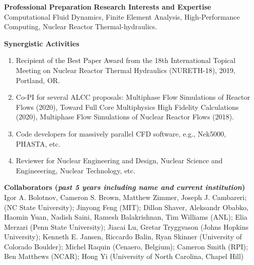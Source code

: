 \documentclass[11pt,letterpaper,english]{article}
\begin{document}
\begin{flushleft} {\bf Professional Preparation}
\vspace{-6pt}
{\bf Research Interests and Expertise}
{\parindent 16pt
Computational Fluid Dynamics, Finite Element Analysis, High-Performance Computing, Nuclear Reactor Thermal-hydraulics.
}

\vspace{.04in}
{\bf Synergistic Activities}
\vspace{-6pt}
\begin{enumerate} \itemsep1pt \parskip0pt 
\item Recipient of the Best Paper Award from the 18th International Topical Meeting on Nuclear Reactor Thermal Hydraulics (NURETH-18), 2019, Portland, OR.
\item Co-PI for several ALCC proposals: Multiphase Flow Simulations of Reactor Flows (2020), Toward Full Core Multiphysics High Fidelity Calculations (2020), Multiphase Flow Simulations of Nuclear Reactor Flows (2018).
\item Code developers for massively parallel CFD software, e.g., Nek5000, PHASTA, etc.  
\item Reviewer for Nuclear Engineering and Design, Nuclear Science and Engineeering, Nuclear Technology, etc.
\end{enumerate}

\vspace{-6pt}
{\bf Collaborators ({\emph{past 5 years including name and current institution}})}
{\parindent 16pt
~\\
Igor A. Bolotnov, Cameron S. Brown, Matthew Zimmer, Joseph J. Cambareri; (NC State University); Jinyong Feng (MIT); Dillon Shaver, Aleksandr Obabko, Haomin Yuan, Nadish Saini, Ramesh Balakrishnan, Tim Williams (ANL); Elia Merzari (Penn State University); Jiacai Lu, Gretar Tryggvason (Johns Hopkins University); Kenneth E. Jansen, Riccardo Balin, Ryan Skinner (University of Colorado Boulder); Michel Raquin (Cenaero, Belgium); Cameron Smith (RPI); Ben Matthews (NCAR); Hong Yi (University of North Carolina, Chapel Hill)
}

\end{flushleft}
\end{document}
